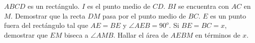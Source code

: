 $ABCD$ es un rectángulo. $I$ es el punto medio de $CD$. $BI$ se encuentra con $AC$ en $M$. Demostrar que la recta $DM$ pasa por el punto medio de $BC$. $E$ es un punto fuera del rectángulo tal que $AE = BE$ y $\angle AEB = 90^o$. Si $BE = BC = x$, demostrar que $EM$ biseca a $\angle AMB$. Hallar el área de $AEBM$ en términos de $x$. 
